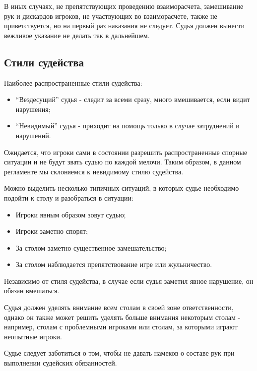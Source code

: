 В иных случаях, не препятствующих проведению взаиморасчета, замешивание рук и дискардов игроков, не участвующих во взаиморасчете, также не приветствуется, но на первый раз наказания не следует. Судья должен вынести вежливое указание не делать так в дальнейшем.

\subsection{Стили судейства}

Наиболее распространенные стили судейства:
\begin{itemize}
	\item “Вездесущий” судья - следит за всеми сразу, много вмешивается, если видит нарушения;
	\item “Невидимый” судья - приходит на помощь только в случае затруднений и нарушений.
\end{itemize}

Ожидается, что игроки сами в состоянии разрешить распространенные спорные ситуации и не будут звать судью по каждой мелочи. Таким образом, в данном регламенте мы склоняемся к невидимому стилю судейства.

Можно выделить несколько типичных ситуаций, в которых судье необходимо подойти к столу и разобраться в ситуации:
\begin{itemize}
	\item Игроки явным образом зовут судью;
	\item Игроки заметно спорят;
	\item За столом заметно существенное замешательство;
	\item За столом наблюдается препятствование игре или жульничество.
\end{itemize}

Независимо от стиля судейства, в случае если судья заметил явное нарушение, он обязан вмешаться.

Судья должен уделять внимание всем столам в своей зоне ответственности, однако он также может решить уделять больше внимания некоторым столам - например, столам с проблемными игроками или столам, за которыми играют неопытные игроки.

Судье следует заботиться о том, чтобы не давать намеков о составе рук при выполнении судейских обязанностей.
